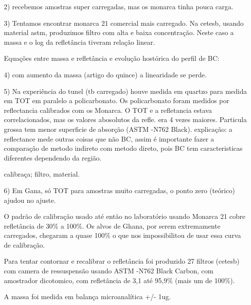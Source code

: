 2) recebemos amostras super carregadas, mas os monarca tinha pouca carga.

3) Tentamos encontrar monarca 21 comercial mais carregado. Na cetesb,
usando material astm, produzimos filtro com alta e baixa concentração.
Neste caso a massa e o log da refletância tiveram relação linear. 

Equações entre massa e refletância e evolução hostórica do perfil de BC:

4) com aumento da massa (artigo do quince) a linearidade se perde. 

5) Na experiência do tunel (tb carregado) houve medida em quartzo para medida
em TOT em paralelo a policarbonato. Os policarbonato foram medidos por reflectancia
calibrados com os Monarca. O TOT e a refletancia estava correlacionados, mas
os valores abosolutos da refle. era 4 vezes maiores.
Particula grossa tem menor superficie de absorção (ASTM -N762 Black). 
explicação: a reflectance mede outras coisas que não BC, assim é importante
fazer a comparação de metodo indireto com metodo direto, pois BC tem caracteristicas
diferentes dependendo da região.

calibraça; filtro, material.

6) Em Gana, só TOT para amostras muito carregadas, o ponto zero (teórico)
ajudou no ajuste.

O padrão de calibração usado até então no laboratório usando Monarca 21 cobre refletância de 30\% a 100\%. 
Os alvos de Ghana, por serem extremamente carregados, chegaram a quase 100\% o que nos impossibilitou de usar 
essa curva de calibração.  

Para tentar contornar e recalibrar o refletância foi produzido 27 filtros (cetesb) com camera de ressuspensão
usando ASTM -N762 Black Carbon, com amostrador dicotomico, com refletância de 3,1 até 95,9\% (mais um de 100\%).

A massa foi medida em balança microanalítica +/- 1ug.


